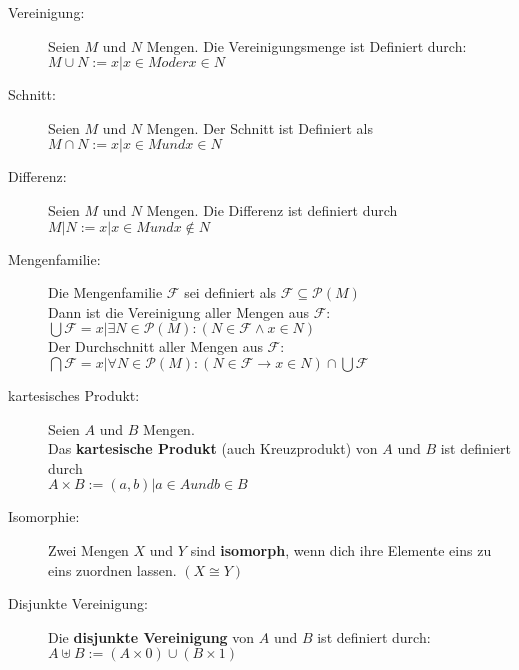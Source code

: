 \begin{description}
  \item [Vereinigung:] 
    Seien $M$ und $N$ Mengen. Die Vereinigungsmenge ist Definiert durch: 
    $M \cup N := {x | x \in M oder x \in N}$

  \item [Schnitt:] 
    Seien $M$ und $N$ Mengen. Der Schnitt ist Definiert als 
    $M \cap N := {x | x \in M und x \in N}$

  \item [Differenz:] 
    Seien $M$ und $N$ Mengen. Die Differenz ist definiert durch 
    $M | N := {x | x \in M und x \notin N}$

  \item [Mengenfamilie:] 
    Die Mengenfamilie $\mathcal{F}$ sei definiert als 
    $\mathcal{F} \subseteq \mathcal{P}(M)$ \\
    Dann ist die Vereinigung aller Mengen aus $\mathcal{F}$:\\
    $\bigcup\mathcal{F} = {x | \exists N \in \mathcal{P}(M) : (N \in \mathcal{F} \wedge x \in N)}$ \\
    Der Durchschnitt aller Mengen aus $\mathcal{F}$: \\ 
    $\bigcap \mathcal{F} = {x | \forall N \in \mathcal{P}(M) : (N \in \mathcal{F} \rightarrow x \in N)} \cap \bigcup \mathcal{F}$ 

  \item [kartesisches Produkt:] 
    Seien $A$ und $B$ Mengen.\\
    Das \textbf{kartesische Produkt} (auch Kreuzprodukt) von $A$ und $B$ ist 
    definiert durch\\
    $A \times B := {(a,b) | a \in A und b \in B}$

  \item [Isomorphie:] 
    Zwei Mengen $X$ und $Y$ sind \textbf{isomorph}, wenn dich ihre Elemente eins
    zu eins zuordnen lassen. $(X \cong Y)$

  \item [Disjunkte Vereinigung:] 
    Die \textbf{disjunkte Vereinigung} von $A$ und $B$ ist definiert durch: \\
    $A \uplus B := (A \times {0}) \cup (B \times {1})$
\end{description}

  
